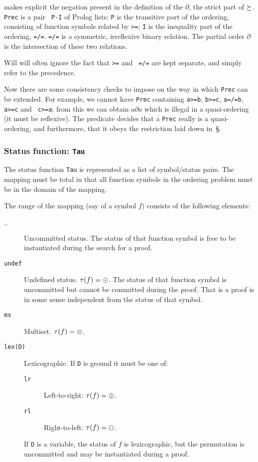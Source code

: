 \clam makes explicit the negation present in the definition of the
$\partial$, the strict part of $\succeq$.  {\tt Prec} is a pair {\tt
P-I} of Prolog lists: {\tt P} is the transitive part of the ordering,
consisting of function symbols related by {\tt >=}; {\tt I} is the
inequality part of the ordering, {\tt =/=}.  {\tt =/=} is a symmetric,
irreflexive binary relation. The partial order $\partial$ is the
intersection of these two relations.  

\begin{remark} Will will often ignore the fact that {\tt >=} and {\tt
=/=} are kept separate, and simply refer to the precedence.
\end{remark}


Now there are some consistency checks to impose on the way in which
{\tt Prec} can be extended.  For example, we cannot have {\tt Prec}
containing {\tt a>=b}, {\tt b>=c}, {\tt a=/=b}, {\tt a>=c} and {\tt
c>=a}; from this we can obtain $a\partial a$ which is illegal in a
quasi-ordering (it must be reflexive).  The predicate 
decides that a {\tt Prec} really is a quasi-ordering, and furthermore,
that it obeys the restriction laid down in~\S{}.


\subsubsection {Status function: {\tt Tau}}
\label {imp:tau}
The status function {\tt Tau} is represented as a list of
symbol/status pairs.  The mapping must be total in that all function
symbols in the ordering problem must be in the domain of the mapping.

The range of the mapping (say of a symbol $f$) consists of the
following elements:
\begin{description}
\item [{\tt\_}] Uncommitted status.  The status of that function
symbol is free to be instantiated during the search for a proof.

\item [{\tt undef}] Undefined status.  $\tau(f)=\odot$. The status of that function
symbol is uncommitted but cannot be committed during the proof.  That
is a proof is in some sense independent from the status of that symbol.

\item [{\tt ms}] Multiset.  $\tau(f)=\otimes$.
\item [{\tt lex(D)}] Lexicographic.  If {\tt D} is ground it must be
one of:
\begin{description}
\item [{\tt lr}] Left-to-right: $\tau(f)=\oplus$.
\item [{\tt rl}] Right-to-left: $\tau(f)=\ominus$.
\end{description}

If  {\tt D}  is a variable, the status of $f$ is lexicographic, but
the permutation is uncommitted and may be instantiated during a proof.
\end{description}



